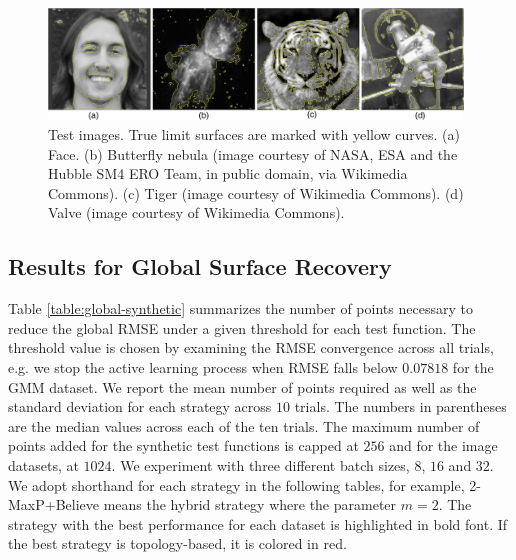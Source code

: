 \begin{figure}[!ht]
\centering
\includegraphics[width=0.98\textwidth]{figs/chap5/images}
\caption{Test images. True limit surfaces are marked with yellow curves.
%
(a) Face.
%
(b) Butterfly nebula (image courtesy of NASA, ESA and the Hubble SM4 ERO Team,
in public domain, via Wikimedia Commons).
%
(c) Tiger (image courtesy of Wikimedia Commons).
%
(d) Valve (image courtesy of Wikimedia Commons).}
\label{fig:images}
\end{figure}

\subsection{Results for Global Surface Recovery}
\label{sec:global_results}
%
Table \ref{table:global-synthetic} summarizes the number of points necessary to reduce the global RMSE under a given threshold for each test function.
%
The threshold value is chosen by examining the RMSE convergence across all trials, e.g. we stop the active learning process when RMSE falls below $0.07818$ for the GMM dataset.
%
We report the mean number of points required as well as the standard deviation for each strategy across $10$ trials.
%
The numbers in parentheses are the median values across each of the ten trials.
%
The maximum number of points added for the synthetic test functions is capped at $256$ and for the image datasets, at $1024$.
%
We experiment with three different batch sizes, $8$, $16$ and $32$.
%
We adopt shorthand for each strategy in the following tables, for example, 2-MaxP+Believe means the hybrid strategy where the parameter $m = 2$.
%
The strategy with the best performance for each dataset is highlighted in bold font.
%
If the best strategy is topology-based, it is colored in red.

